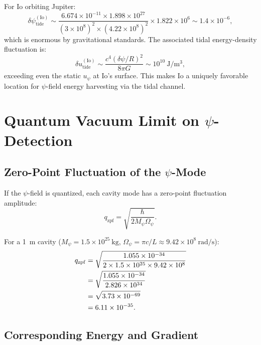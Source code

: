 \documentclass[aps,prd,twocolumn,showpacs,preprintnumbers,superscriptaddress,nofootinbib]{revtex4-2}
\newcommand{\Mpsi}{M_\psi}
\newcommand{\Opsi}{\Omega_\psi}
\begin{document}
For Io orbiting Jupiter:
\begin{equation}
\delta\psi_{\mathrm{tide}}^{(\mathrm{Io})}
  \sim \frac{6.674\times 10^{-11}\times 1.898\times 10^{27}}{(3\times 10^8)^2\times (4.22\times 10^8)^2}\times 1.822\times 10^6
  \sim 1.4\times 10^{-6},
\end{equation}
which is enormous by gravitational standards.  The associated tidal
energy-density fluctuation is:
\begin{equation}
\delta u_{\mathrm{tide}}^{(\mathrm{Io})} \sim \frac{c^4(\delta\psi/R)^2}{8\pi G}
  \sim 10^{10}~\mathrm{J/m^3},
\end{equation}
exceeding even the static $u_\psi$ at Io's surface.  This makes Io a
uniquely favorable location for $\psi$-field energy harvesting via the
tidal channel.

\section{Quantum Vacuum Limit on $\psi$-Detection}\label{sec:quantum}

\subsection{Zero-Point Fluctuation of the $\psi$-Mode}\label{sec:zpf}

If the $\psi$-field is quantized, each cavity mode has a zero-point
fluctuation amplitude:
\begin{equation}\label{eq:q-zpf}
q_{\mathrm{zpf}} = \sqrt{\frac{\hbar}{2\Mpsi\Opsi}}.
\end{equation}

For a 1~m cavity ($\Mpsi = 1.5\times 10^{25}~\mathrm{kg}$,
$\Opsi = \pi c/L \approx 9.42\times 10^8~\mathrm{rad/s}$):
\begin{align}
q_{\mathrm{zpf}} &= \sqrt{\frac{1.055\times 10^{-34}}{2\times 1.5\times 10^{25}\times 9.42\times 10^8}} \notag\\
  &= \sqrt{\frac{1.055\times 10^{-34}}{2.826\times 10^{34}}} \notag\\
  &= \sqrt{3.73\times 10^{-69}} \notag\\
  &= 6.11\times 10^{-35}.
\end{align}

\subsection{Corresponding Energy and Gradient}\label{sec:zpf-energy}
\end{document}
